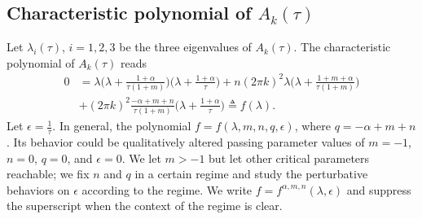 \documentclass[a4paper,11pt]{article}
\theoremstyle{remark}
\begin{document}
\subsection{Characteristic polynomial of $A_k(\tau)$}
Let $\lambda_i(\tau)$, $i=1,2,3$ be the three eigenvalues of $A_k(\tau)$. %
The characteristic polynomial of $A_k(\tau)$ reads
% 
% 
% 
% 
\begin{align}
0&= \lambda\Big(\lambda + \frac{1+\alpha}{\tau(1+m)}\Big)\Big(\lambda + \frac{1+\alpha}{\tau}\Big) + n(2\pi k)^2\lambda\Big(\lambda + \frac{1+m+\alpha}{\tau(1+m)}\Big)\nonumber\\
&+ (2\pi k)^2\frac{-\alpha+m+n}{\tau(1+m)}\Big(\lambda + \frac{1+\alpha}{\tau}\Big)\triangleq f(\lambda). \label{eq:poly}
\end{align}
Let $\epsilon = \frac{1}{\tau}$. In general, the polynomial $f=f(\lambda,m,n,q,\epsilon)$, where $q=-\alpha+m+n$. Its behavior could be qualitatively altered passing parameter values of $m=-1$, $n=0$, $q=0$, and $\epsilon=0$. We  let $m>-1$ but let other critical parameters reachable; we fix $n$ and $q$ in a certain regime and study the perturbative behaviors on $\epsilon$ according to the regime. We write $f= f^{\alpha,m,n}(\lambda,\epsilon)$ and suppress the superscript when the context of the regime is clear.
\end{document}
